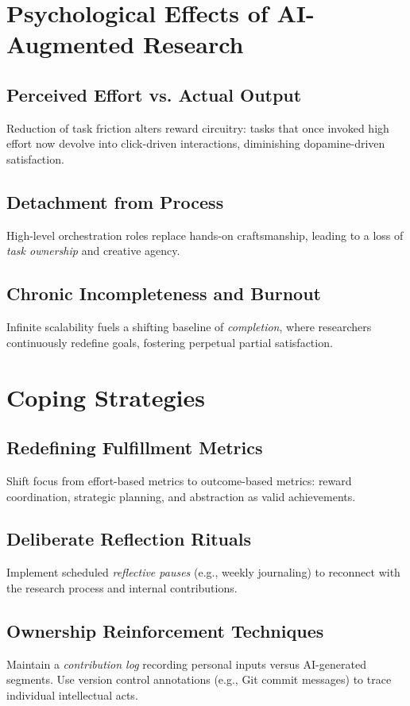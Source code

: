 \documentclass[11pt]{article}
\begin{document}
\section{Psychological Effects of AI-Augmented Research}
\subsection{Perceived Effort vs. Actual Output}
Reduction of task friction alters reward circuitry: tasks that once invoked high effort now devolve into click-driven interactions, diminishing dopamine-driven satisfaction.

\subsection{Detachment from Process}
High-level orchestration roles replace hands-on craftsmanship, leading to a loss of \emph{task ownership} and creative agency.

\subsection{Chronic Incompleteness and Burnout}
Infinite scalability fuels a shifting baseline of \emph{completion}, where researchers continuously redefine goals, fostering perpetual partial satisfaction.

\section{Coping Strategies}
\subsection{Redefining Fulfillment Metrics}
Shift focus from effort-based metrics to outcome-based metrics: reward coordination, strategic planning, and abstraction as valid achievements.

\subsection{Deliberate Reflection Rituals}
Implement scheduled \emph{reflective pauses} (e.g., weekly journaling) to reconnect with the research process and internal contributions.

\subsection{Ownership Reinforcement Techniques}
Maintain a \emph{contribution log} recording personal inputs versus AI-generated segments. Use version control annotations (e.g., Git commit messages) to trace individual intellectual acts.
\end{document}
